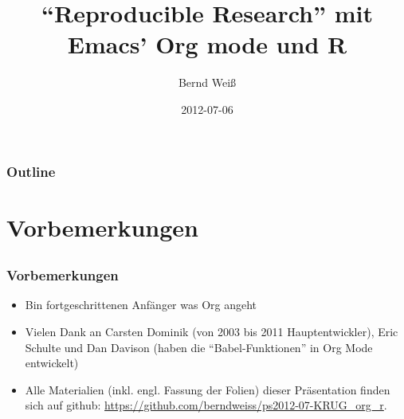 \documentclass[bigger]{beamer}
\institute{\url{http://berndweiss.net} \\ \url{bernd.weiss@uni-koeln.de}}
\title{\enquote{Reproducible Research} mit \newline Emacs' Org mode und R}
\author{Bernd Weiß}
\date{\footnotesize{2012-07-06}}
\begin{document}
\maketitle

\begin{frame}
\frametitle{Outline}
\setcounter{tocdepth}{3}
\tableofcontents
\end{frame}























\section{Vorbemerkungen}
\label{sec-1}
\subsection{}
\begin{frame}
\frametitle{Vorbemerkungen}
\label{sec-1-1-1}

\begin{itemize}
\item Bin fortgeschrittenen Anfänger was Org angeht
\item Vielen Dank an Carsten Dominik (von 2003 bis 2011 Hauptentwickler), Eric Schulte und Dan Davison
  (haben die \enquote{Babel-Funktionen} in Org Mode entwickelt)
\item Alle Materialien (inkl. engl. Fassung der Folien) dieser Präsentation finden sich auf github: \href{https://github.com/berndweiss/ps2012-07-KRUG_org_r}{https://github.com/berndweiss/ps2012-07-KRUG\_org\_r}.
\end{itemize}
\end{frame}
\end{document}

